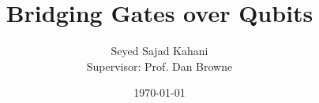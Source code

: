 \documentclass{report}
\title{Bridging Gates over Qubits}
\author{Seyed Sajad Kahani \\Supervisor: Prof. Dan Browne}
\date{\today}
\begin{document}
\maketitle

\tableofcontents

\begin{abstract}
  
\end{abstract}











\printbibliography
\end{document}
